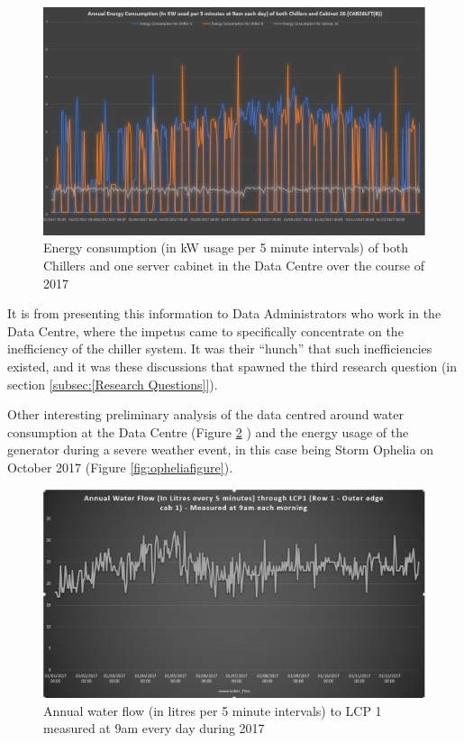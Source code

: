 \documentclass[12pt]{scrartcl}
\begin{document}
\begin{figure}[H]
  \caption{Energy consumption (in kW usage per 5 minute intervals) of both Chillers and one server cabinet in the Data Centre over the course of 2017}
  \label{fig:cabvchillerfigure}
  \centering
    \includegraphics[scale=0.45]{Energy_consumption_of_cab26_and_chillers}
\end{figure} 

It is from presenting this information to Data Administrators who work in the Data Centre, where the impetus came to specifically concentrate on the inefficiency of the chiller system. It was their ``hunch'' that such inefficiencies existed, and it was these discussions that spawned the third research question (in section \ref{subsec:[Research Questions]}).   

Other interesting preliminary analysis of the data centred around water consumption at the Data Centre (Figure \ref{fig:annualwaterfigure} ) and the energy usage of the generator during a severe weather event, in this case being Storm Ophelia on October 2017 (Figure \ref{fig:opheliafigure}). 

\begin{figure}[H]
  \caption{Annual water flow (in litres per 5 minute intervals) to LCP 1 measured at 9am every day during 2017}
  \label{fig:annualwaterfigure}
  \centering
    \includegraphics[scale=0.45]{Annual_Water_Flow}
\end{figure} 
\end{document}
